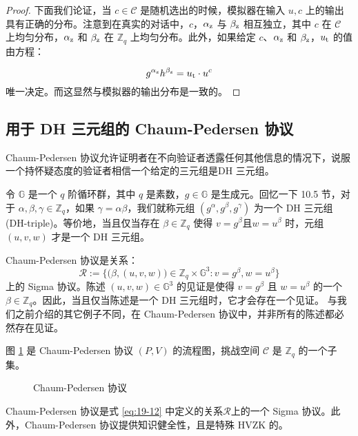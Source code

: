 \begin{proof}
下面我们论证，当 $c\in\mathcal{C}$ 是随机选出的时候，模拟器在输入 $u,c$ 上的输出具有正确的分布。注意到在真实的对话中，$c$，$\alpha_{\rm z}$ 与 $\beta_{\rm z}$ 相互独立，其中 $c$ 在 $\mathcal{C}$ 上均匀分布，$\alpha_{\rm z}$ 和 $\beta_{\rm z}$ 在 $\mathbb{Z}_q$ 上均匀分布。此外，如果给定 $c$、$\alpha_{\rm z}$ 和 $\beta_{\rm z}$，$u_{\rm t}$ 的值由方程：

\[
g^{\alpha_{\rm z}}h^{\beta_{\rm z}}=u_{\rm t}\cdot u^c
\]
唯一决定。而这显然与模拟器的输出分布是一致的。
\end{proof}

\subsection{用于 DH 三元组的 Chaum-Pedersen 协议}\label{subsec:19-5-2}

Chaum-Pedersen 协议允许证明者在不向验证者透露任何其他信息的情况下，说服一个持怀疑态度的验证者相信一个给定的三元组是DH 三元组。

令 $\mathbb{G}$ 是一个 $q$ 阶循环群，其中 $q$ 是素数，$g\in\mathbb{G}$ 是生成元。回忆一下 10.5 节，对于 $\alpha,\beta,\gamma\in\mathbb{Z}_q$，如果 $\gamma=\alpha\beta$，我们就称元组 $(g^\alpha,g^\beta,g^\gamma)$ 为一个 DH 三元组 (DH-triple)。等价地，当且仅当存在 $\beta\in\mathbb{Z}_q$ 使得 $v=g^\beta$且$w=u^\beta$ 时，元组 $(u,v,w)$ 才是一个 DH 三元组。

Chaum-Pedersen 协议是关系：
\begin{equation}\label{eq:19-12}
\mathcal{R}:=\bigg\lbrace
\big(\beta, (u,v,w)\big)\in\mathbb{Z}_q\times\mathbb{G}^3:v=g^\beta, w=u^\beta
\bigg\rbrace
\end{equation}
上的 Sigma 协议。陈述 $(u,v,w)\in\mathbb{G}^3$ 的见证是使得 $v=g^\beta$ 且 $w=u^\beta$ 的一个 $\beta\in\mathbb{Z}_q$。因此，当且仅当陈述是一个 DH 三元组时，它才会存在一个见证。 与我们之前介绍的其它例子不同，在 Chaum-Pedersen 协议中，并非所有的陈述都必然存在见证。 

图 \ref{fig:19-7} 是 Chaum-Pedersen 协议 $(P,V)$ 的流程图，挑战空间 $\mathcal{C}$ 是 $\mathbb{Z}_q$ 的一个子集。

\begin{figure}
  \centering
  
  \caption{Chaum-Pedersen 协议}
  \label{fig:19-7}
\end{figure}

\begin{theorem}
Chaum-Pedersen 协议是式 \ref{eq:19-12} 中定义的关系$\mathcal R$上的一个 Sigma 协议。此外，Chaum-Pedersen 协议提供知识健全性，且是特殊 HVZK 的。
\end{theorem}

